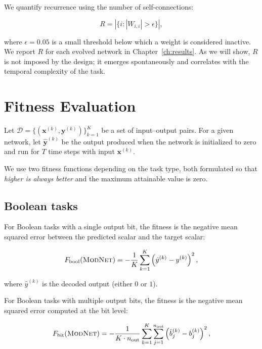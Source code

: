 We quantify recurrence using the number of self-connections:

\begin{equation}
  R = \left| \{i : |W_{i,i}| > \epsilon\} \right|,
  \label{eq:method-recurrence-metric}
\end{equation}

where $\epsilon = 0.05$ is a small threshold below which a weight is
considered inactive. We report $R$ for each evolved network in
Chapter~\ref{ch:results}. As we will show, $R$ is not imposed by the
design; it emerges spontaneously and correlates with the temporal
complexity of the task.

\section{Fitness Evaluation}
\label{sec:method-fitness}

Let $\mathcal{D} = \{(\mathbf{x}^{(k)}, \mathbf{y}^{(k)})\}_{k=1}^{K}$
be a set of input--output pairs. For a given network, let
$\hat{\mathbf{y}}^{(k)}$ be the output produced when the network is
initialized to zero and run for $T$ time steps with input
$\mathbf{x}^{(k)}$.

We use two fitness functions depending on the task type, both
formulated so that \emph{higher is always better} and the maximum
attainable value is zero.

\subsection{Boolean tasks}

For Boolean tasks with a single output bit, the fitness is the negative
mean squared error between the predicted scalar and the target scalar:

\begin{equation}
  F_{\text{bool}}(\textsc{ModNet}{}) = -\frac{1}{K} \sum_{k=1}^{K}
    \left( \hat{y}^{(k)} - y^{(k)} \right)^2,
  \label{eq:method-fitness-boolean}
\end{equation}

where $\hat{y}^{(k)}$ is the decoded output (either $0$ or $1$).

For Boolean tasks with multiple output bits, the fitness is the negative
mean squared error computed at the bit level:

\begin{equation}
  F_{\text{bit}}(\textsc{ModNet}{}) = -\frac{1}{K \cdot n_{\text{out}}}
    \sum_{k=1}^{K} \sum_{j=1}^{n_{\text{out}}}
    \left( \hat{b}_j^{(k)} - b_j^{(k)} \right)^2,
  \label{eq:method-fitness-bit}
\end{equation}

